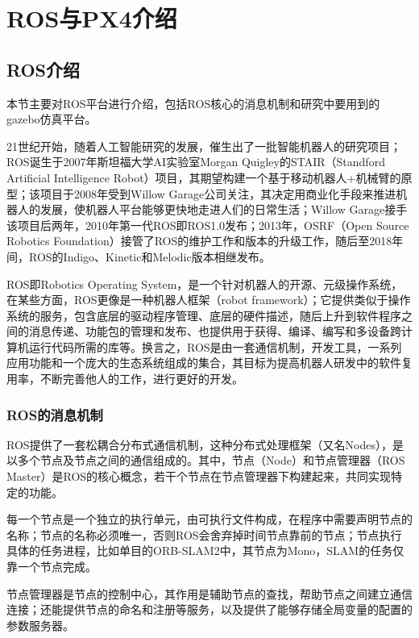 \renewcommand{\baselinestretch}{1.5}
\fontsize{12pt}{13pt}\selectfont

\chapter{ROS与PX4介绍}\label{introduction}

\section{ROS介绍}
本节主要对ROS平台进行介绍，包括ROS核心的消息机制和研究中要用到的gazebo仿真平台。

21世纪开始，随着人工智能研究的发展，催生出了一批智能机器人的研究项目；ROS诞生于2007年斯坦福大学AI实验室Morgan Quigley的STAIR（Standford Artificial Intelligence Robot）项目，其期望构建一个基于移动机器人+机械臂的原型；该项目于2008年受到Willow Garage公司关注，其决定用商业化手段来推进机器人的发展，使机器人平台能够更快地走进人们的日常生活；Willow Garage接手该项目后两年，2010年第一代ROS即ROS1.0发布；2013年，OSRF（Open Source Robotics Foundation）接管了ROS的维护工作和版本的升级工作，随后至2018年间，ROS的Indigo、Kinetic和Melodic版本相继发布。

ROS即Robotics Operating System，是一个针对机器人的开源、元级操作系统，在某些方面，ROS更像是一种机器人框架（robot framework）；它提供类似于操作系统的服务，包含底层的驱动程序管理、底层的硬件描述，随后上升到软件程序之间的消息传递、功能包的管理和发布、也提供用于获得、编译、编写和多设备跨计算机运行代码所需的库等。换言之，ROS是由一套通信机制，开发工具，一系列应用功能和一个庞大的生态系统组成的集合，其目标为提高机器人研发中的软件复用率，不断完善他人的工作，进行更好的开发。

\subsection{ROS的消息机制} \label{2.1.1}

ROS提供了一套松耦合分布式通信机制，这种分布式处理框架（又名Nodes），是以多个节点及节点之间的通信组成的。其中，节点（Node）和节点管理器（ROS Master）是ROS的核心概念，若干个节点在节点管理器下构建起来，共同实现特定的功能。

每一个节点是一个独立的执行单元，由可执行文件构成，在程序中需要声明节点的名称；节点的名称必须唯一，否则ROS会舍弃掉时间节点靠前的节点；节点执行具体的任务进程，比如单目的ORB-SLAM2中，其节点为Mono，SLAM的任务仅靠一个节点完成。

节点管理器是节点的控制中心，其作用是辅助节点的查找，帮助节点之间建立通信连接；还能提供节点的命名和注册等服务，以及提供了能够存储全局变量的配置的参数服务器。

